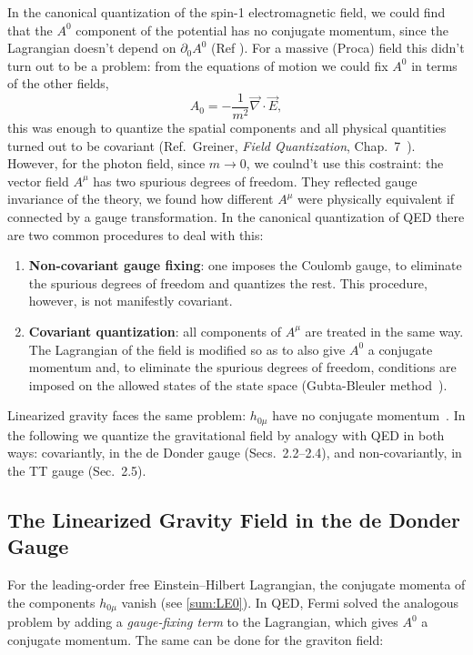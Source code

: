\documentclass[12pt,a4paper,oneside]{article}
\numberwithin{equation}{section}   %
\begin{document}
In the canonical quantization of the spin-1 electromagnetic field, we could find
that the $A^0$ component of the potential has no conjugate momentum,
 since the Lagrangian doesn't depend on $\partial_0A^0$ (Ref \cite{GreinerFQ}\cite{tannoudji}). 
 For a massive (Proca) field this didn't turn out to be a problem: from the
 equations of motion we could fix $A^0$ in terms of the other fields,
\begin{equation}
    A_0 = -\frac{1}{m^2}\vec{\nabla}\cdot\vec{E},
\end{equation} 
this was enough to quantize the
spatial components and all physical quantities turned out
to be covariant (Ref.\ Greiner,
\textit{Field Quantization}, Chap.~7~\cite{GreinerFQ}).
However, for the photon field,
 since $m\to0$, we coulnd't use this costraint:
  the vector field $A^\mu$ has two spurious degrees of
freedom. They reflected
 gauge invariance of the theory, we found how different $A^\mu$
were physically equivalent if connected by a gauge transformation. 
In the canonical quantization of QED
there are two common procedures to deal with this:

\begin{enumerate}
\item \textbf{Non-covariant gauge fixing}: one imposes the
 Coulomb gauge, to eliminate
the spurious degrees of freedom and quantizes the rest. 
This procedure, however, is not manifestly covariant.
\item \textbf{Covariant quantization}: all components of $A^\mu$ are treated in the
same way. 
The Lagrangian of the field is modified so as to also give $A^0$ a conjugate
momentum and, to eliminate the spurious degrees of freedom, conditions are imposed on
the allowed states of the state space (Gubta-Bleuler method~\cite{GreinerFQ}).
\end{enumerate}

Linearized gravity faces the same problem: $h_{0\mu}$ have
no conjugate momentum~\cite{Rezvan2024}. In the
following we quantize the gravitational field by analogy with QED
 in both ways: covariantly, in the de Donder
gauge (Secs.~2.2--2.4), and non-covariantly, in the TT gauge (Sec.~2.5).


\subsection{The Linearized Gravity Field in the de Donder Gauge}
For the leading-order free Einstein--Hilbert Lagrangian, the conjugate
momenta of the components $h_{0\mu}$ vanish (see \eqref{sum:LE0}).
In QED, Fermi solved the analogous problem by adding a \textit{gauge-fixing
term} to the Lagrangian, which gives $A^0$ a conjugate momentum. The same can
be done for the graviton field:
\end{document}
